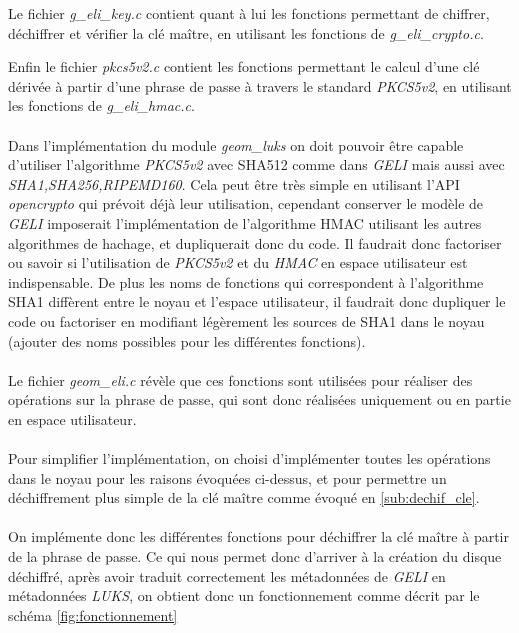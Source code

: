Le fichier {\em g\_eli\_key.c} contient quant à lui les fonctions permettant de
chiffrer, déchiffrer et vérifier la clé maître, en utilisant les fonctions de
{\em g\_eli\_crypto.c}.

Enfin le fichier {\em pkcs5v2.c} contient les fonctions permettant le calcul
d'une clé dérivée à partir d'une phrase de passe à travers le standard
{\em PKCS5v2}, en utilisant les fonctions de {\em g\_eli\_hmac.c}.

\paragraph{}
Dans l'implémentation du module {\em geom\_luks} on doit pouvoir être capable
d'utiliser l'algorithme {\em PKCS5v2} avec SHA512 comme dans {\em GELI} mais
aussi avec {\em SHA1,SHA256,RIPEMD160}. Cela peut être très simple en utilisant
l'API {\em opencrypto} qui prévoit déjà leur utilisation, cependant conserver
le modèle de {\em GELI} imposerait l'implémentation de l'algorithme HMAC utilisant
les autres algorithmes de hachage, et dupliquerait donc du code. Il faudrait
donc factoriser ou savoir si l'utilisation de {\em PKCS5v2} et du {\em HMAC}
en espace utilisateur est indispensable. De plus les noms de fonctions qui
correspondent à l'algorithme SHA1 diffèrent entre le noyau et l'espace
utilisateur, il faudrait donc dupliquer le code ou factoriser en modifiant
légèrement les sources de SHA1 dans le noyau (ajouter des noms possibles pour
les différentes fonctions).

\paragraph{}
Le fichier {\em geom\_eli.c} révèle que ces fonctions sont utilisées pour réaliser
des opérations sur la phrase de passe, qui sont donc réalisées uniquement ou
en partie en espace utilisateur.

\paragraph{}
Pour simplifier l'implémentation, on choisi d'implémenter toutes les opérations
dans le noyau pour les raisons évoquées ci-dessus, et pour permettre un 
déchiffrement plus simple de la clé maître comme évoqué en \ref{sub:dechif_cle}.
\paragraph{}
On implémente donc les différentes fonctions pour déchiffrer la clé maître à
partir de la phrase de passe. Ce qui nous permet donc d'arriver à la création
du disque déchiffré, après avoir traduit correctement les métadonnées de
{\em GELI} en métadonnées {\em LUKS}, on obtient donc un fonctionnement
comme décrit par le schéma \ref{fig:fonctionnement}


